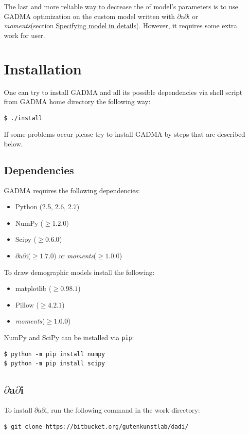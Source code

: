 \documentclass[12pt]{article}
\makeatletter
\newcommand{\dadi}{$\partial$a$\partial$i\xspace}
\newcommand{\moments}{\textit{moments}\xspace}
\newcommand{\py}[1]{\lstinline[language=Python, showstringspaces=False]@#1@}
\makeatother
\begin{document}
The last and more reliable way to decrease the of model's parameters is to use GADMA optimization on the custom model written with \dadi or \moments (section \hyperref[sec:spec-model-in-det]{Specifying model in details}). However, it requires some extra work for user.

\newpage
\section{Installation}

One can try to install GADMA and all its possible dependencies via shell script from GADMA home directory the following way:
\begin{lstlisting}
$ ./install
\end{lstlisting}

If some problems occur please try to install GADMA by steps that are described below.

\subsection{Dependencies}
GADMA requires the following dependencies:
\begin{itemize}
    \item Python (2.5, 2.6, 2.7)
    \item NumPy ($\geq 1.2.0$)
    \item Scipy ($\geq 0.6.0$)
    \item \dadi ($\geq 1.7.0$) or \moments ($\geq 1.0.0$)
\end{itemize}
To draw demographic models install the following:
\begin{itemize}
    \item matplotlib ($\geq 0.98.1$)
    \item Pillow ($\geq 4.2.1$)
    \item \moments ($\geq 1.0.0$)
\end{itemize}

NumPy and SciPy can be installed via \py{pip}:
\begin{lstlisting}
$ python -m pip install numpy
$ python -m pip install scipy
\end{lstlisting}

\subsection{\dadi}
To install \dadi, run the following command in the work directory:

\begin{lstlisting}
$ git clone https://bitbucket.org/gutenkunstlab/dadi/
\end{lstlisting}
\end{document}
